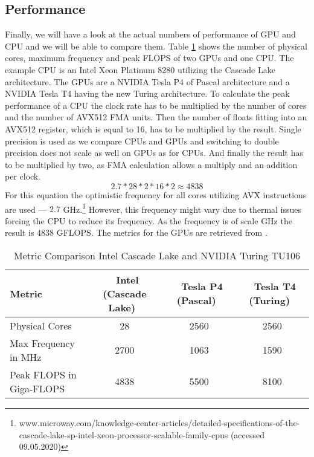 \documentclass[a4paper,12pt]{llncs}
\numberwithin{equation}{section}
\begin{document}
\subsection{Performance}
  Finally, we will have a look at the actual numbers of performance of GPU and CPU and we will be able to compare them.
  Table \ref{tab:comp} shows the number of physical cores, maximum frequency and peak FLOPS of two GPUs and one CPU.
  The example CPU is an Intel Xeon Platinum 8280 utilizing the Cascade Lake architecture.
  The GPUs are a NVIDIA Tesla P4 of Pascal architecture and a NVIDIA Tesla T4 having the new Turing architecture.
  To calculate the peak performance of a CPU the clock rate has to be multiplied by the number of cores and the number of AVX512 FMA units.
  Then the number of floats fitting into an AVX512 register, which is equal to 16, has to be multiplied by the result.
  Single precision is used as we compare CPUs and GPUs and switching to double precision does not scale as well on GPUs as for CPUs.
  And finally the result has to be multiplied by two, as FMA calculation allows a multiply and an addition per clock.
  \[2.7 * 28 * 2 * 16 * 2 \approx 4838\]
  For this equation the optimistic frequency for all cores utilizing AVX instructions are used --- \(2.7\) GHz.\footnote{www.microway.com/knowledge-center-articles/detailed-specifications-of-the-cascade-lake-sp-intel-xeon-processor-scalable-family-cpus (accessed 09.05.2020)}
  However, this frequency might vary due to thermal issues forcing the CPU to reduce its frequency.
  As the frequency is of scale GHz the result is 4838 GFLOPS.
  The metrics for the GPUs are retrieved from \cite{NVIDIA.2018}.
  
\begin{table}[htbp]
  \centering
  \caption{Metric Comparison Intel Cascade Lake and NVIDIA Turing TU106}
  \label{tab:comp}
  \begin{tabular}{|l|c|c|c|}
    \hline
	\textbf{Metric} & \textbf{~Intel (Cascade Lake)~} & \textbf{~Tesla P4 (Pascal)~} & \textbf{~Tesla T4 (Turing)~} \\\hline
	Physical Cores & 28 & 2560 & 2560 \\\hline
	Max Frequency in MHz & 2700 & 1063 & 1590 \\\hline
	Peak FLOPS in Giga-FLOPS & 4838 & 5500 & 8100 \\\hline
  \end{tabular}
\end{table}


\end{document}
